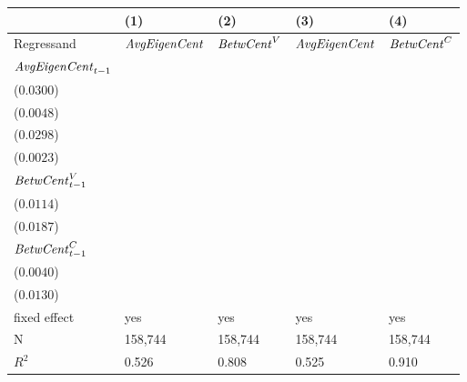 \begin{tabular}{lllll}
\toprule
{} &                                      (1) &                                      (2) &                                      (3) &                                       (4) \\
\midrule
Regressand                 &                     ${\it AvgEigenCent}$ &                       ${\it BetwCent}^V$ &                     ${\it AvgEigenCent}$ &                        ${\it BetwCent}^C$ \\
${\it AvgEigenCent}_{t-1}$ &  \makecell{$0.7462^{***}$ \\ ($0.0300$)} &   \makecell{$-0.0082^{*}$ \\ ($0.0048$)} &  \makecell{$0.7475^{***}$ \\ ($0.0298$)} &  \makecell{$-0.0063^{***}$ \\ ($0.0023$)} \\
${\it BetwCent}^V_{t-1}$   &     \makecell{$0.0156^{}$ \\ ($0.0114$)} &  \makecell{$0.8773^{***}$ \\ ($0.0187$)} &                              \makecell{} &                               \makecell{} \\
${\it BetwCent}^C_{t-1}$   &                              \makecell{} &                              \makecell{} &     \makecell{$0.0061^{}$ \\ ($0.0040$)} &   \makecell{$0.9499^{***}$ \\ ($0.0130$)} \\
\midrule fixed effect      &                                      yes &                                      yes &                                      yes &                                       yes \\
N                          &                                  158,744 &                                  158,744 &                                  158,744 &                                   158,744 \\
$R^2$                      &                                    0.526 &                                    0.808 &                                    0.525 &                                     0.910 \\
\bottomrule
\end{tabular}
